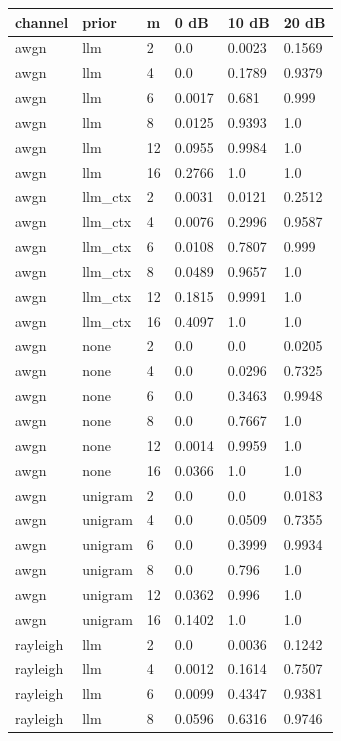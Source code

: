 \begin{tabular}{llllll}
\hline
channel & prior & m & 0 dB & 10 dB & 20 dB \\
\hline
awgn & llm & 2 & 0.0 & 0.0023 & 0.1569 \\
awgn & llm & 4 & 0.0 & 0.1789 & 0.9379 \\
awgn & llm & 6 & 0.0017 & 0.681 & 0.999 \\
awgn & llm & 8 & 0.0125 & 0.9393 & 1.0 \\
awgn & llm & 12 & 0.0955 & 0.9984 & 1.0 \\
awgn & llm & 16 & 0.2766 & 1.0 & 1.0 \\
awgn & llm\_ctx & 2 & 0.0031 & 0.0121 & 0.2512 \\
awgn & llm\_ctx & 4 & 0.0076 & 0.2996 & 0.9587 \\
awgn & llm\_ctx & 6 & 0.0108 & 0.7807 & 0.999 \\
awgn & llm\_ctx & 8 & 0.0489 & 0.9657 & 1.0 \\
awgn & llm\_ctx & 12 & 0.1815 & 0.9991 & 1.0 \\
awgn & llm\_ctx & 16 & 0.4097 & 1.0 & 1.0 \\
awgn & none & 2 & 0.0 & 0.0 & 0.0205 \\
awgn & none & 4 & 0.0 & 0.0296 & 0.7325 \\
awgn & none & 6 & 0.0 & 0.3463 & 0.9948 \\
awgn & none & 8 & 0.0 & 0.7667 & 1.0 \\
awgn & none & 12 & 0.0014 & 0.9959 & 1.0 \\
awgn & none & 16 & 0.0366 & 1.0 & 1.0 \\
awgn & unigram & 2 & 0.0 & 0.0 & 0.0183 \\
awgn & unigram & 4 & 0.0 & 0.0509 & 0.7355 \\
awgn & unigram & 6 & 0.0 & 0.3999 & 0.9934 \\
awgn & unigram & 8 & 0.0 & 0.796 & 1.0 \\
awgn & unigram & 12 & 0.0362 & 0.996 & 1.0 \\
awgn & unigram & 16 & 0.1402 & 1.0 & 1.0 \\
rayleigh & llm & 2 & 0.0 & 0.0036 & 0.1242 \\
rayleigh & llm & 4 & 0.0012 & 0.1614 & 0.7507 \\
rayleigh & llm & 6 & 0.0099 & 0.4347 & 0.9381 \\
rayleigh & llm & 8 & 0.0596 & 0.6316 & 0.9746 \\

\end{tabular}
